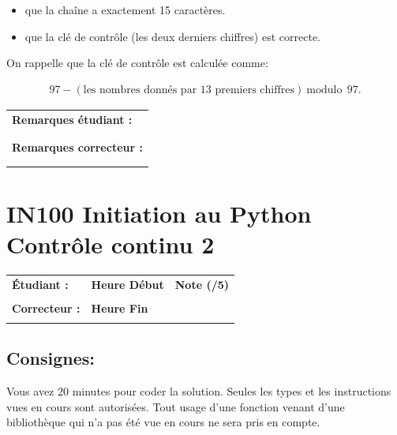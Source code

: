 \documentclass[a4paper,11pt]{article}
\begin{document}
\begin{itemize}
\item que la chaîne a exactement 15 caractères. 
\item que  la clé de contrôle (les deux derniers chiffres) est correcte. 
\end{itemize}

On rappelle que la clé de contrôle est calculée comme: 

\begin{eqnarray*}
97- (\mbox{les nombres donnés par 13 premiers chiffres})~\mbox{modulo}~~97. 
\end{eqnarray*}




\begin{table}[h!]
\centering
\renewcommand{\arraystretch}{1.4} %
\begin{tabular}{|p{15cm}|}
\hline
\textbf{Remarques étudiant :}    \\
 \\
 \\
\hline
\textbf{Remarques correcteur :}  \\
 \\
 \\
\hline
\end{tabular}
\end{table}


\newpage


\section*{\center IN100 Initiation au Python\\
Contrôle continu 2}


\begin{table}[h!]
\centering
\renewcommand{\arraystretch}{1.4} %
\begin{tabular}{|p{10cm}|p{3cm}|p{2cm}|}
\hline
\textbf{Étudiant :} & \textbf{Heure Début }  & \textbf{Note (/5) }  \\
& & \\
\hline
\textbf{Correcteur :} & \textbf{Heure Fin } & \\
& & \\
\hline

\hline
\end{tabular}
\end{table}

\subsection*{Consignes:} Vous avez 20 minutes pour coder la solution. Seules les types et les instructions vues en cours sont autorisées. Tout usage d'une fonction 
venant d'une bibliothèque qui n'a pas été vue en cours ne sera pris en compte. 
\end{document}
